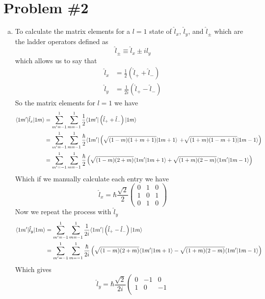\documentclass[11pt]{article}
\numberwithin{equation}{section}
\begin{document}
\pagebreak

\section{Problem \#2}
\begin{enumerate}[(a)]
\item To calculate the matrix elements for a $l=1$ state of $\hat{l}_x$, $\hat{l}_y$, and
$\hat{l}_{\pm}$ which are the ladder operators defined as
$$\hat{l}_{\pm} \equiv \hat{l}_x \pm i\hat{l}_y$$
which allows us to say that
\begin{align*}
\hat{l}_x &= \frac{1}{2}\left(\hat{l}_{+}+\hat{l}_{-}\right)\\
\hat{l}_y &= \frac{1}{2i}\left(\hat{l}_{+}-\hat{l}_{-}\right)
\end{align*}
So the matrix elements for $l=1$ we have
\begin{align*}
\langle{1m'}|\hat{l}_x|{1m}\rangle &= \sum_{m'=-1}^{1}\sum_{m=-1}^{1}\frac{1}{2}\langle{1m'}|\left(\hat{l}_{+}+\hat{l}_{-}\right)|{1m}\rangle\\
&= \sum_{m'=-1}^{1}\sum_{m=-1}^{1}\frac{\hbar}{2}\langle{1m'}|\left(\sqrt{(1-m)(1+m+1)}|{1m+1}\rangle\right.\left.+\sqrt{(1+m)(1-m+1)}|{1m-1}\rangle\right)\\
&= \sum_{m'=-1}^{1}\sum_{m=-1}^{1}\frac{\hbar}{2}\left(\sqrt{(1-m)(2+m)}\langle{1m'}|{1m+1}\rangle+\sqrt{(1+m)(2-m)}\langle{1m'}|{1m-1}\rangle\right)
\end{align*}
Which if we manually calculate each entry we have
$$\hat{l}_x = \hbar\frac{\sqrt{2}}{2}\left(\begin{array}{ccc}
              0        &1     &0\\
              1        &0     &1\\
              0        &1     &0
              \end{array}\right)$$
Now we repeat the process with $\hat{l}_y$
\begin{align*}
\langle{1m'}|\hat{l}_y|{1m}\rangle &= \sum_{m'=-1}^{1}\sum_{m=-1}^{1}\frac{1}{2i}\langle{1m'}|\left(\hat{l}_{+}-\hat{l}_{-}\right)|{1m}\rangle\\
&= \sum_{m'=-1}^{1}\sum_{m=-1}^{1}\frac{\hbar}{2i}\left(\sqrt{(1-m)(2+m)}\langle{1m'}|{1m+1}\rangle-\sqrt{(1+m)(2-m)}\langle{1m'}|{1m-1}\rangle\right)
\end{align*}
Which gives 
$$\hat{l}_y = \hbar\frac{\sqrt{2}}{2i}\left(\begin{array}{ccc}
              0        &-1    &0\\
              1        &0     &-1\\

\end{array}$$
\end{enumerate}
\end{document}
